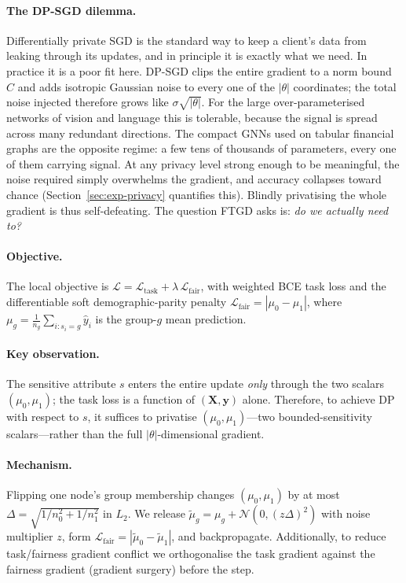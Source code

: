 \paragraph{The DP-SGD dilemma.}
Differentially private SGD is the standard way to keep a client's data from
leaking through its updates, and in principle it is exactly what we need. In
practice it is a poor fit here. DP-SGD clips the entire gradient to a norm bound
$C$ and adds isotropic Gaussian noise to every one of the $|\theta|$
coordinates; the total noise injected therefore grows like $\sigma\sqrt{|\theta|}$.
For the large over-parameterised networks of vision and language this is
tolerable, because the signal is spread across many redundant directions. The
compact GNNs used on tabular financial graphs are the opposite regime: a few
tens of thousands of parameters, every one of them carrying signal. At any
privacy level strong enough to be meaningful, the noise required simply
overwhelms the gradient, and accuracy collapses toward chance
(Section~\ref{sec:exp-privacy} quantifies this). Blindly privatising the whole
gradient is thus self-defeating. The question FTGD asks is: \emph{do we actually
need to?}

\paragraph{Objective.}
The local objective is $\mathcal{L}=\mathcal{L}_{\text{task}}+\lambda\,
\mathcal{L}_{\text{fair}}$, with weighted BCE task loss and the differentiable
soft demographic-parity penalty
$\mathcal{L}_{\text{fair}}=|\mu_0-\mu_1|$, where
$\mu_g=\frac{1}{n_g}\sum_{i:s_i=g}\hat{y}_i$ is the group-$g$ mean prediction.

\paragraph{Key observation.}
The sensitive attribute $s$ enters the entire update \emph{only} through the two
scalars $(\mu_0,\mu_1)$; the task loss is a function of $(\mathbf{X},\mathbf{y})$
alone. Therefore, to achieve DP with respect to $s$, it suffices to privatise
$(\mu_0,\mu_1)$---two bounded-sensitivity scalars---rather than the full
$|\theta|$-dimensional gradient.

\paragraph{Mechanism.}
Flipping one node's group membership changes $(\mu_0,\mu_1)$ by at most
$\Delta=\sqrt{1/n_0^2+1/n_1^2}$ in $L_2$. We release
$\tilde{\mu}_g=\mu_g+\mathcal{N}(0,(z\Delta)^2)$ with noise multiplier $z$, form
$\mathcal{L}_{\text{fair}}=|\tilde{\mu}_0-\tilde{\mu}_1|$, and backpropagate.
Additionally, to reduce task/fairness gradient conflict we orthogonalise the
task gradient against the fairness gradient (gradient surgery) before the step.

